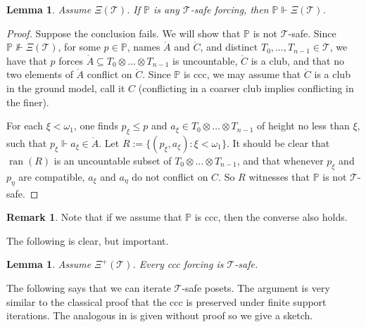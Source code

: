 \documentclass[a4paper,noamsfonts]{amsart}
\newtheorem{lemma}[theorem]{Lemma}
\theoremstyle{definition}
\newtheorem{remark}[theorem]{Remark}
\renewcommand{\P}{\mathbb {P}}
\newcommand{\seb}{\subseteq}
\newcommand{\dt}[1]{\mathring{#1}}
\newcommand{\forces}{\Vdash}
\newcommand{\1}{\mathbf{1}}
\newcommand{\T}{\mathcal{T}}
\newcommand{\prop}{\Xi}
\newcommand{\propp}{\prop^{+}}
\DeclareMathOperator{\ran}{ran}
\begin{document}
\begin{lemma}\label{lem:safe-preserves}
  Assume $\prop(\T)$. If $\P$ is any $\T$-safe
  forcing, then $\P \forces \prop(\T)$.
\end{lemma}
\begin{proof}
  Suppose the conclusion fails. We will show that $\P$ is not $\T$-safe.
  Since $\P \not\forces \prop(\T)$, for
  some $p \in \P$, names $\dt{A}$ and $\dt{C}$, and distinct $T_{0},\dots,
  T_{n-1} \in \T$, we have that
  $p$ forces $\dt{A} \seb T_{0} \otimes \dots \otimes T_{n-1}$
  is uncountable, $\dt{C}$ is a club,
  and that no two elements of $\dt{A}$ conflict on $\dt{C}$. Since $\P$ is
  ccc, we may assume that $\dt{C}$ is a club in the ground model,
  call it $C$ (conflicting in a coarser club implies conflicting in the
  finer).

  For each $\xi < \omega_{1}$, one finds $p_{\xi} \le p$ and
  $a_{\xi} \in T_{0}\otimes \dots \otimes T_{n-1}$ of height no less than
  $\xi$, such that $p_{\xi}\forces a_{\xi} \in \dt{A}$. Let
  $R := \{(p_{\xi},a_{\xi}) : \xi < \omega_{1}\}$. It should be clear
  that $\ran(R)$ is an uncountable subset of
  $T_{0}\otimes \dots \otimes T_{n-1}$, and that whenever $p_{\xi}$ and $p_{\eta}$
  are compatible, $a_{\xi}$ and $a_{\eta}$ do not conflict on $C$.
  So $R$ witnesses that $\P$ is not $\T$-safe.
\end{proof}

\begin{remark}\label{rmk:converse-if-ccc}
  Note that if we assume that $\P$ is ccc, then the converse also holds.
\end{remark}

The following is clear, but important.

\begin{lemma}\label{lem:psi+-safe}
  Assume $\propp(\T)$. Every ccc forcing
  is $\T$-safe.
\end{lemma}

The following says that we can iterate $\T$-safe posets. The argument
is very similar to the classical proof that the ccc is preserved under
finite support iterations. The analogous
in \cite{ShelahAbraham} is given without proof so we give a sketch.
\end{document}
